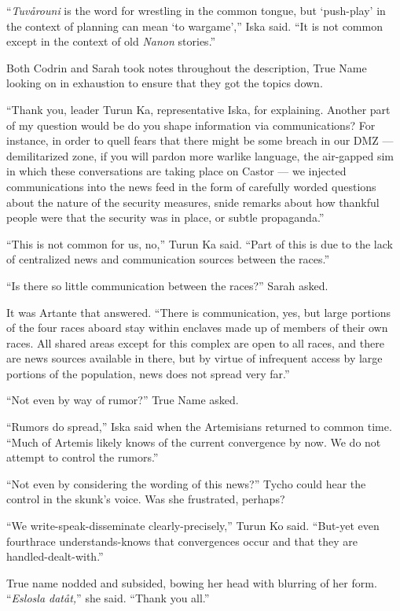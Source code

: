 ``\emph{Tuvårouni} is the word for wrestling in the common tongue, but `push-play' in the context of planning can mean `to wargame','' Iska said. ``It is not common except in the context of old \emph{Nanon} stories.''

Both Codrin and Sarah took notes throughout the description, True Name looking on in exhaustion to ensure that they got the topics down.

``Thank you, leader Turun Ka, representative Iska, for explaining. Another part of my question would be do you shape information via communications? For instance, in order to quell fears that there might be some breach in our DMZ — demilitarized zone, if you will pardon more warlike language, the air-gapped sim in which these conversations are taking place on Castor — we injected communications into the news feed in the form of carefully worded questions about the nature of the security measures, snide remarks about how thankful people were that the security was in place, or subtle propaganda.''

``This is not common for us, no,'' Turun Ka said. ``Part of this is due to the lack of centralized news and communication sources between the races.''

``Is there so little communication between the races?'' Sarah asked.

It was Artante that answered. ``There is communication, yes, but large portions of the four races aboard stay within enclaves made up of members of their own races. All shared areas except for this complex are open to all races, and there are news sources available in there, but by virtue of infrequent access by large portions of the population, news does not spread very far.''

``Not even by way of rumor?'' True Name asked.

``Rumors do spread,'' Iska said when the Artemisians returned to common time. ``Much of Artemis likely knows of the current convergence by now. We do not attempt to control the rumors.''

``Not even by considering the wording of this news?'' Tycho could hear the control in the skunk's voice. Was she frustrated, perhaps?

``We write-speak-disseminate clearly-precisely,'' Turun Ko said. ``But-yet even fourthrace understands-knows that convergences occur and that they are handled-dealt-with.''

True name nodded and subsided, bowing her head with blurring of her form. ``\emph{Eslosla datåt,}'' she said. ``Thank you all.''

